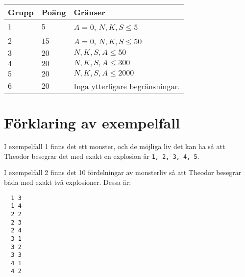 \noindent
\begin{tabular}{| l | l | p{12cm} |}
  \hline
  \textbf{Grupp} & \textbf{Poäng} & \textbf{Gränser} \\ \hline
  $1$    & $5$        & $A = 0$, $N, K, S \leq 5$ \\ \hline
  $2$    & $15$       & $A = 0$, $N, K, S \leq 50$ \\ \hline
  $3$    & $20$       & $N, K, S, A \leq 50$ \\ \hline
  $4$    & $20$       & $N, K, S, A \leq 300$ \\ \hline
  $5$    & $20$       & $N, K, S, A \leq 2000$ \\ \hline
  $6$    & $20$       & Inga ytterligare begränsningar. \\ \hline
\end{tabular}

\section*{Förklaring av exempelfall}
I exempelfall 1 finns det ett monster, och de möjliga liv det kan ha så att Theodor besegrar det med exakt en explosion är \verb+1, 2, 3, 4, 5+.


I exempelfall 2 finns det 10 fördelningar av monsterliv så att Theodor besegrar båda med exakt två explosioner. Dessa är:
\begin{verbatim}
  1 3
  1 4
  2 2
  2 3
  2 4
  3 1
  3 2
  3 3
  4 1
  4 2
\end{verbatim}
